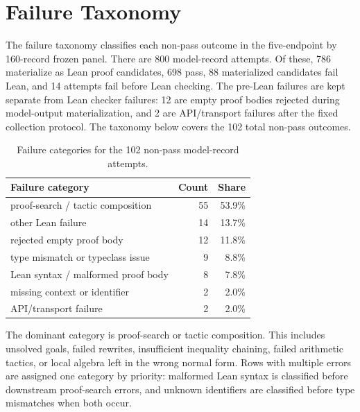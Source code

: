 \section{Failure Taxonomy}

The failure taxonomy classifies each non-pass outcome in the five-endpoint by
160-record frozen panel. There are 800 model-record attempts. Of these, 786
materialize as Lean proof candidates, 698 pass, 88 materialized candidates fail
Lean, and 14 attempts fail before Lean checking. The pre-Lean failures are
kept separate from Lean checker failures: 12 are empty proof bodies rejected
during model-output materialization, and 2 are API/transport failures after
the fixed collection protocol. The taxonomy below covers the 102 total
non-pass outcomes.

\begin{table}[htbp]
\centering
\caption{Failure categories for the 102 non-pass model-record attempts.}
\label{tab:supp-failure-taxonomy}
\begin{tabular}{lrr}
\toprule
Failure category & Count & Share\\
\midrule
proof-search / tactic composition & 55 & 53.9\%\\
other Lean failure & 14 & 13.7\%\\
rejected empty proof body & 12 & 11.8\%\\
type mismatch or typeclass issue & 9 & 8.8\%\\
Lean syntax / malformed proof body & 8 & 7.8\%\\
missing context or identifier & 2 & 2.0\%\\
API/transport failure & 2 & 2.0\%\\
\bottomrule
\end{tabular}
\end{table}

The dominant category is proof-search or tactic composition. This includes
unsolved goals, failed rewrites, insufficient inequality chaining, failed
arithmetic tactics, or local algebra left in the wrong normal form. Rows with
multiple errors are assigned one category by priority: malformed Lean syntax is
classified before downstream proof-search errors, and unknown identifiers are
classified before type mismatches when both occur.

